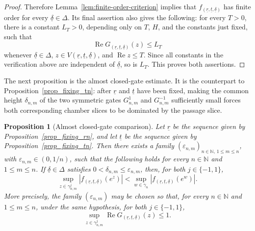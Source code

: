 \documentclass[a4paper, 11pt, reqno]{amsart}
\numberwithin{equation}{section}
\theoremstyle{plain}
\newtheorem{proposition}[theorem]{Proposition}
\theoremstyle{remark}
\newcommand{\N}{{\mathbb{N}}}
\newcommand{\uldelta}{\underline{\delta}}
\newcommand{\ulr}{\underline{r}}
\newcommand{\ult}{\underline{t}}
\newcommand{\Rea}{\operatorname{Re }}
\begin{document}
\begin{proof}
	Therefore Lemma~\ref{lem:finite-order-criterion} implies that
	\(f_{(\ulr,\ult,\uldelta)}\) has finite order for every \(\uldelta\in\Delta\).
	Its final assertion also gives the following: for every \(T>0\), there is a
	constant \(L_T>0\), depending only on \(T\), \(H\), and the constants just fixed,
	such that
	\[
	\Rea G_{(\ulr,\ult,\uldelta)}(z)\le L_T
	\]
	whenever \(\uldelta\in\Delta\), \(z\in V(\ulr,\ult,\uldelta)\), and
	\(\Rea z\le T\). Since all constants in the verification above are independent
	of \(\uldelta\), so is \(L_T\). This proves both assertions.
\end{proof}

The next proposition is the almost closed-gate estimate. It is the counterpart to
Proposition~\ref{prop_fixing_tn}: after \(\ulr\) and \(\ult\) have been fixed,
making the common height \(\delta_{n,m}\) of the two symmetric gates
\(G^1_{n,m}\) and \(G^{-1}_{n,m}\) sufficiently small forces both corresponding chamber slices to be dominated by the passage slice. 

\begin{proposition}[Almost closed-gate comparison]\label{prop_closing_deltan}
	Let \(\ulr\) be the sequence given by Proposition~\ref{prop_fixing_rn}, and let \(\ult\) be the sequence given by Proposition~\ref{prop_fixing_tn}. Then there exists a family \((\varepsilon_{n,m})_{n\in\N,\,1\le m\le n}\), with \(\varepsilon_{n,m}\in(0,1/n)\), such that the following holds for every \(n\in\N\) and \(1\le m\le n\). If \(\uldelta\in \Delta\) satisfies \(0<\delta_{n,m}\leq\varepsilon_{n,m}\), then, for both \(j\in\{-1,1\}\),
	\[
	\sup_{z\in\gamma^j_{n,m}} |f_{(\ulr,\ult,\uldelta)}(e^z)|
	<
	\sup_{w\in\gamma_n}|f_{(\ulr,\ult,\uldelta)}(e^w)|.
	\]
	More precisely, the family \((\varepsilon_{n,m})\) may be chosen so that, for every \(n\in\N\) and \(1\le m\le n\), under the same hypothesis, for both \(j\in\{-1,1\}\),
	\begin{equation}\label{eq:prop4.3}
		\sup_{z\in\gamma^j_{n,m}}\Rea G_{(\ulr,\ult,\uldelta)}(z)\leq1.
	\end{equation}
\end{proposition}
\end{document}
